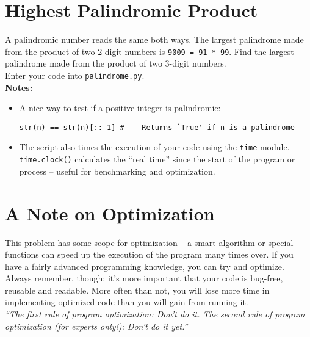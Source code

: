 \documentclass{article}
\begin{document}
\section*{Highest Palindromic Product}

A palindromic number reads the same both ways. The largest palindrome made from
the product of two 2-digit numbers is \texttt{9009 = 91 * 99}. Find the largest 
palindrome made from the product of two 3-digit numbers.
\newline \\ Enter your code into \texttt{palindrome.py}. 
\newline \\
\textbf{Notes: }
\begin{itemize}
\item A nice way to test if a positive integer is palindromic:
\begin{verbatim}str(n) == str(n)[::-1] #	Returns `True' if n is a palindrome \end{verbatim}
\item The script also times the
execution of your code using the \texttt{time} module. \texttt{time.clock()} 
calculates the ``real time'' since the start of the program or process -- useful 
for benchmarking and optimization.
\end{itemize}
\section*{A Note on Optimization}
This problem has some scope for optimization -- a smart algorithm or special
functions can speed up the execution of the program many times over. If you have 
a fairly advanced programming knowledge, you can try and optimize.
\newline \\ Always remember, though: it's more important that your code is bug-free,
reusable and readable. More often than not, you will lose more time in
implementing optimized code than you will gain from running it.
\newline \\ \emph{``The first rule of program optimization: Don't do it. 
The second rule of program optimization (for experts only!): Don't do it yet.''}
\end{document}

